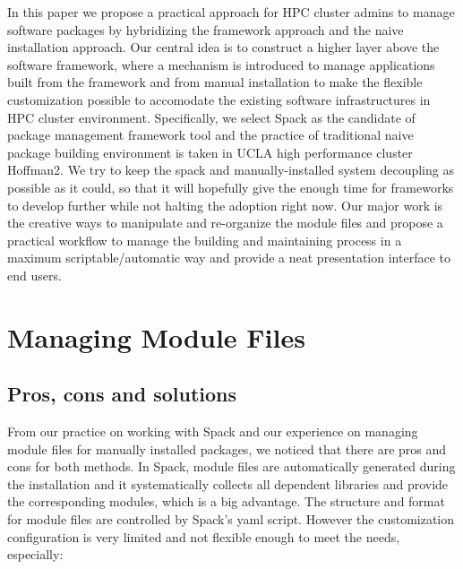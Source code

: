 \documentclass[conference]{IEEEtran}
\begin{document}
In this paper we propose a practical approach for HPC cluster admins to manage software packages by hybridizing the framework approach and the naive installation approach. 
Our central idea is to construct a higher layer above the software framework, where a mechanism is introduced to manage applications built from the framework and from manual installation to make the flexible customization possible to accomodate the existing software infrastructures in HPC cluster environment.
Specifically, we select Spack as the candidate of package management framework tool and the practice of traditional naive package building environment is taken in UCLA high performance cluster Hoffman2.  
We try to keep the spack and manually-installed system decoupling as possible as it could, so that it will hopefully give the enough time for frameworks to develop further while not halting the adoption right now. 
Our major work is the creative ways to manipulate and re-organize the module files and propose a practical workflow to manage the building and maintaining process in a maximum scriptable/automatic way and provide a neat presentation interface to end users.


\section{Managing Module Files} \label{sec_modulefiles}

\subsection{Pros, cons and solutions}

From our practice on working with Spack and our experience on managing module files for manually installed packages, we noticed that there are pros and cons for both methods. In Spack, module files are automatically generated during the installation and it systematically collects all dependent libraries and provide the corresponding modules, which is a big advantage. The structure and format for module files are controlled by Spack's yaml script. However the customization configuration is very limited and not flexible enough to meet the needs, especially:
\end{document}
